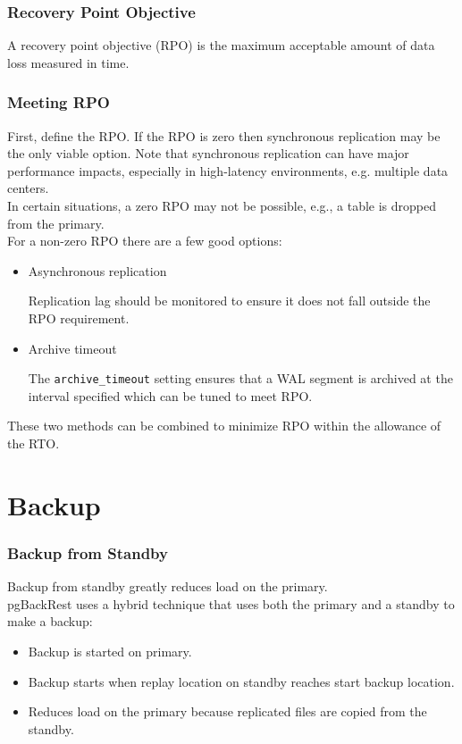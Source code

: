 \begin{frame}[fragile]
    \frametitle{Recovery Point Objective}

    \Large A recovery point objective (RPO) is the maximum acceptable amount of data loss measured in time.
\end{frame}

\begin{frame}[fragile]
    \frametitle{Meeting RPO}

    First, define the RPO. If the RPO is zero then synchronous replication may be the only viable option. Note that synchronous replication can have major performance impacts, especially in high-latency environments, e.g. multiple data centers.
    \\\vspace{1em}
    In certain situations, a zero RPO may not be possible, e.g., a table is dropped from the primary.
    \\\vspace{1em}
    For a non-zero RPO there are a few good options:

    \begin{itemize}
        \item Asynchronous replication

        Replication lag should be monitored to ensure it does not fall outside the RPO requirement.

        \item Archive timeout

        The \texttt{archive\_timeout} setting ensures that a WAL segment is archived at the interval specified which can be tuned to meet RPO.
    \end{itemize}

    These two methods can be combined to minimize RPO within the allowance of the RTO.
\end{frame}

\section{Backup}

\begin{frame}
    \frametitle{Backup from Standby}

    Backup from standby greatly reduces load on the primary.
    \\\vspace{1em}
    pgBackRest uses a hybrid technique that uses both the primary and a standby to make a backup:

    \begin{itemize}
        \item Backup is started on primary.
        \item Backup starts when replay location on standby reaches start backup location.
        \item Reduces load on the primary because replicated files are copied from the standby.
    \end{itemize}
\end{frame}


